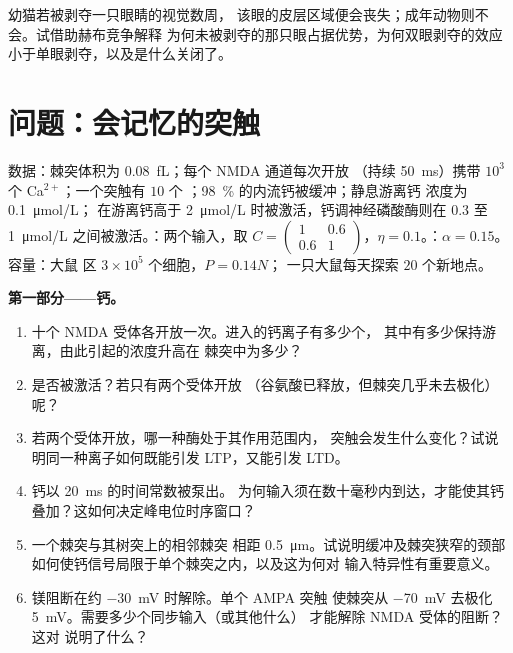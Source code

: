 \begin{exercise}[$\star\star\star$]\label{exo:b3:learning-memory:12}
幼猫若被剥夺一只眼睛的视觉数周，
该眼的皮层区域便会丧失；成年动物则不会。试借助赫布竞争解释
为何未被剥夺的那只眼占据优势，为何双眼剥夺的效应
小于单眼剥夺，以及是什么关闭了。
\end{exercise}

\section{问题：会记忆的突触}

\begin{problem}
\label{pb:b3:learning-memory:1}
数据：棘突体积为 \qty{0.08}{fL}；每个 NMDA 通道每次开放
（持续 \qty{50}{ms}）携带 $10^{3}$ 个 Ca$^{2+}$；一个突触有 $10$ 个 ；\qty{98}{\%} 的内流钙被缓冲；静息游离钙
浓度为 \qty{0.1}{\micro mol/L}； 在游离钙高于
\qty{2}{\micro mol/L} 时被激活，钙调神经磷酸酶则在 $0.3$ 至
\qty{1}{\micro mol/L} 之间被激活。：两个输入，取 $C = \begin{pmatrix}1 &
0.6\\ 0.6 & 1\end{pmatrix}$，$\eta = 0.1$。：$\alpha =
0.15$。容量：大鼠  区 $3\times 10^{5}$ 个细胞，$P = 0.14N$；
一只大鼠每天探索 $20$ 个新地点。

\medskip
\noindent\textbf{第一部分——钙。}
\begin{enumerate}
  \item 十个 NMDA 受体各开放一次。进入的钙离子有多少个，
        其中有多少保持游离，由此引起的浓度升高在
        棘突中为多少？
  \item {} 是否被激活？若只有两个受体开放
        （谷氨酸已释放，但棘突几乎未去极化）呢？
  \item 若两个受体开放，哪一种酶处于其作用范围内，
        突触会发生什么变化？试说明同一种离子如何既能引发
        LTP，又能引发 LTD。
  \item 钙以 \qty{20}{ms} 的时间常数被泵出。
        为何输入须在数十毫秒内到达，才能使其钙
        叠加？这如何决定峰电位时序窗口？
  \item 一个棘突与其树突上的相邻棘突
        相距 \qty{0.5}{\micro m}。试说明缓冲及棘突狭窄的颈部
        如何使钙信号局限于单个棘突之内，以及这为何对
        输入特异性有重要意义。
  \item 镁阻断在约 \qty{-30}{mV} 时解除。单个 AMPA 突触
        使棘突从
        \qty{-70}{mV} 去极化 \qty{5}{mV}。需要多少个同步输入（或其他什么）
        才能解除 NMDA 受体的阻断？这对
        说明了什么？
\end{enumerate}


\end{problem}
